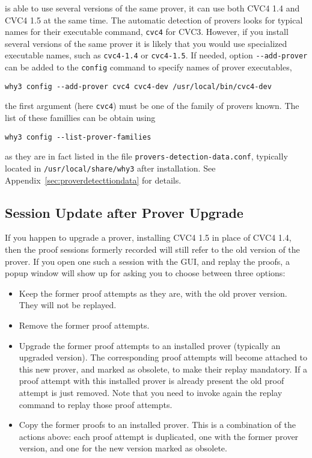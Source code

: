 \why is able to use several versions of the same
prover, \eg it can use both CVC4 1.4 and CVC4 1.5 at the same time.
The automatic detection of provers looks for typical names for their
executable command, \eg \texttt{cvc4} for CVC3. However, if you
install several versions of the same prover it is likely that you would
use specialized executable names, such as \texttt{cvc4-1.4} or
\texttt{cvc4-1.5}. If needed, option \verb|--add-prover| can be
added to the \texttt{config} command to specify names of prover executables, \eg
{}
\begin{verbatim}
why3 config --add-prover cvc4 cvc4-dev /usr/local/bin/cvc4-dev
\end{verbatim}
the first argument (here \verb|cvc4|) must be one of the family of
provers known. The list of these famillies can be obtain using
\begin{verbatim}
why3 config --list-prover-families
\end{verbatim}
as they are in fact listed in the file \verb|provers-detection-data.conf|, typically
located in \verb|/usr/local/share/why3| after installation. See
Appendix~\ref{sec:proverdetecttiondata} for details.


\subsection{Session Update after Prover Upgrade}
\label{sec:uninstalledprovers}

If you happen to upgrade a prover, \eg installing CVC4 1.5 in place
of CVC4 1.4, then the proof sessions formerly recorded will still
refer to the old version of the prover. If you open one such a session
with the GUI, and replay the proofs, a popup window will show up for asking you to choose
between three options:
\begin{itemize}
\item Keep the former proof attempts as they are, with the old prover version. They will not be replayed.
\item Remove the former proof attempts.
\item Upgrade the former proof attempts to an installed prover
  (typically an upgraded version). The corresponding proof attempts
  will become attached to this new prover, and marked as obsolete, to
  make their replay mandatory. If a proof attempt with this installed prover
  is already present the old proof attempt is just removed. Note that you
  need to invoke again the replay command to replay those proof
  attempts.
\item Copy the former proofs to an installed prover. This is a
  combination of the actions above: each proof attempt is duplicated,
  one with the former prover version, and one for the new
  version marked as obsolete.
\end{itemize}

